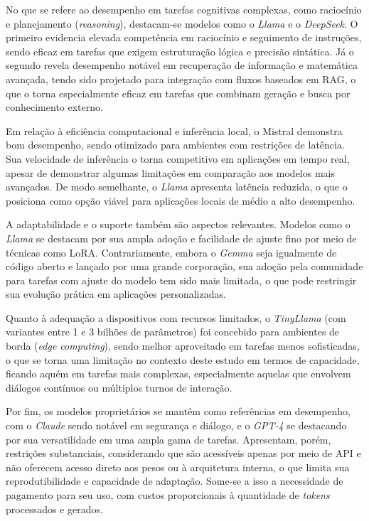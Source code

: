 No que se refere ao desempenho em tarefas cognitivas complexas, como raciocínio e planejamento (\textit{reasoning}), destacam-se modelos como o \textit{Llama} e o \textit{DeepSeek}. O primeiro evidencia elevada competência em raciocínio e seguimento de instruções, sendo eficaz em tarefas que exigem estruturação lógica e precisão sintática. Já o segundo revela desempenho notável em recuperação de informação e matemática avançada, tendo sido projetado para integração com fluxos baseados em \ac{RAG}, o que o torna especialmente eficaz em tarefas que combinam geração e busca por conhecimento externo.

Em relação à eficiência computacional e inferência local, o Mistral demonstra bom desempenho, sendo otimizado para ambientes com restrições de latência. Sua velocidade de inferência o torna competitivo em aplicações em tempo real, apesar de demonstrar algumas limitações em comparação aos modelos mais avançados. De modo semelhante, o \textit{Llama} apresenta latência reduzida, o que o posiciona como opção viável para aplicações locais de médio a alto desempenho.

A adaptabilidade e o suporte também são aspectos relevantes. Modelos como o \textit{Llama} se destacam por sua ampla adoção e facilidade de ajuste fino por meio de técnicas como LoRA. Contrariamente, embora o \textit{Gemma} seja igualmente de código aberto e lançado por uma grande corporação, sua adoção pela comunidade para tarefas com ajuste do modelo tem sido mais limitada, o que pode restringir sua evolução prática em aplicações personalizadas.

Quanto à adequação a dispositivos com recursos limitados, o \textit{TinyLlama} (com variantes entre 1 e 3 bilhões de parâmetros) foi concebido para ambientes de borda (\textit{edge computing}), sendo melhor aproveitado em tarefas menos sofisticadas, o que se torna uma limitação no contexto deste estudo em termos de capacidade, ficando aquém em tarefas mais complexas, especialmente aquelas que envolvem diálogos contínuos ou múltiplos turnos de interação.

Por fim, os modelos proprietários se mantêm como referências em desempenho, com o \textit{Claude} sendo notável em segurança e diálogo, e o \textit{GPT‑4} se destacando por sua versatilidade em uma ampla gama de tarefas. Apresentam, porém, restrições substanciais, considerando que são acessíveis apenas por meio de API e não oferecem acesso direto aos pesos ou à arquitetura interna, o que limita sua reprodutibilidade e capacidade de adaptação. Some-se a isso a necessidade de pagamento para seu uso, com custos proporcionais à quantidade de \textit{tokens} processados e gerados.

